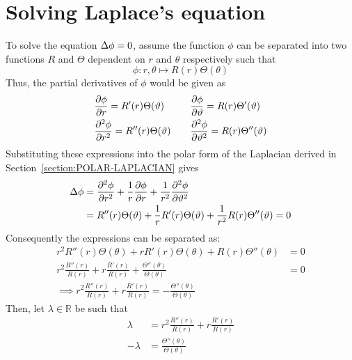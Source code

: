 \section{Solving Laplace's equation}
To solve the equation $\Delta\phi=0$, assume the function $\phi$ can be separated into two functions $R$ and $\Theta$
dependent on $r$ and $\theta$ respectively such that
$$
    \phi:r,\theta\mapsto R(r)\Theta(\theta)
$$
Thus, the partial derivatives of $\phi$ would be given as
\begin{align*}
    &\pdv{\phi}{r}=R'(r)\Theta(\vartheta)\quad&&\pdv{\phi}{\vartheta}=R(r)\Theta'(\vartheta)\\
    &\pdv[2]{\phi}{r}=R''(r)\Theta(\vartheta)\quad&&\pdv[2]{\phi}{\vartheta}=R(r)\Theta''(\vartheta)
\end{align*}
Substituting these expressions into the polar form of the Laplacian derived in Section~\ref{section:POLAR-LAPLACIAN} gives
\begin{align*}
    \Delta\phi&=\pdv[2]{\phi}{r}+\frac{1}{r}\pdv{\phi}{r}+\frac{1}{r^2}\pdv[2]{\phi}{\vartheta}\\
    &=R''(r)\Theta(\vartheta)+\frac{1}{r}R'(r)\Theta(\vartheta)+\frac{1}{r^2}R(r)\Theta''(\vartheta)=0
\end{align*}
Consequently the expressions can be separated as:
\begin{align*}
    r^2R''(r)\Theta(\theta)+rR'(r)\Theta(\theta)+R(r)\Theta''(\theta)&=0\\
    r^2\frac{R''(r)}{R(r)}+r\frac{R'(r)}{R(r)}+\frac{\Theta''(\theta)}{\Theta(\theta)}&=0\\
    \implies r^2\frac{R''(r)}{R(r)}+r\frac{R'(r)}{R(r)}=-\frac{\Theta''(\theta)}{\Theta(\theta)}
\end{align*}
Then, let $\lambda\in\mathbb{R}$ be such that
\begin{align}
    \label{equation:laplace-equation:1}\lambda&=r^2\frac{R''(r)}{R(r)}+r\frac{R'(r)}{R(r)}\\
    \label{equation:laplace-equation:2}-\lambda&=\frac{\Theta''(\theta)}{\Theta(\theta)}
\end{align}

